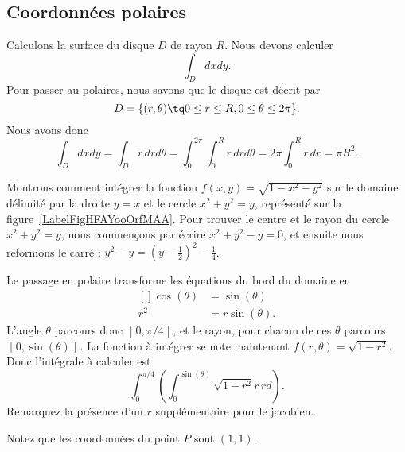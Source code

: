 \subsection{Coordonnées polaires}

\begin{example}
    Calculons la surface du disque $D$ de rayon $R$. Nous devons calculer
    \begin{equation}
        \int_Ddxdy.
    \end{equation}
    Pour passer au polaires, nous savons que le disque est décrit par
    \begin{equation}
        D=\{ (r,\theta)\tq 0\leq r\leq R,0\leq\theta\leq 2\pi \}.
    \end{equation}
    Nous avons donc
    \begin{equation}
        \int_Ddxdy=\int_{D}r\,drd\theta=\int_0^{2\pi}\int_0^Rr\,drd\theta=2\pi\int_0^Rr\,dr=\pi R^2.
    \end{equation}
\end{example}

\begin{example}     \label{ExpmfDtAtV}
    Montrons comment intégrer la fonction $f(x,y)=\sqrt{1-x^2-y^2}$ sur le domaine délimité par la droite $y=x$ et le cercle $x^2+y^2=y$, représenté sur la figure~\ref{LabelFigHFAYooOrfMAA}. Pour trouver le centre et le rayon du cercle $x^2+y^2=y$, nous commençons par écrire $x^2+y^2-y=0$, et ensuite nous reformons le carré : $y^2-y=(y-\frac{ 1 }{2})^2-\frac{1}{ 4 }$.

\newcommand{\CaptionFigHFAYooOrfMAA}{Passage en polaire pour intégrer sur un morceau de cercle.}


    Le passage en polaire transforme les équations du bord du domaine en
    \begin{equation}
        \begin{aligned}[]
            \cos(\theta)&=\sin(\theta)\\
            r^2&=r\sin(\theta).
        \end{aligned}
    \end{equation}
    L'angle $\theta$ parcours donc $\mathopen] 0 , \pi/4 \mathclose[$, et le rayon, pour chacun de ces $\theta$ parcours $\mathopen] 0 , \sin(\theta) \mathclose[$. La fonction à intégrer se note maintenant $f(r,\theta)=\sqrt{1-r^2}$. Donc l'intégrale à calculer est
    \begin{equation}		\label{PgOMRapIntMultFubiniBoutCercle}
        \int_{0}^{\pi/4}\left( \int_0^{\sin(\theta)}\sqrt{1-r^2}r\,rd \right).
    \end{equation}
    Remarquez la présence d'un $r$ supplémentaire pour le jacobien.

    Notez que les coordonnées du point $P$ sont $(1,1)$.
\end{example}

